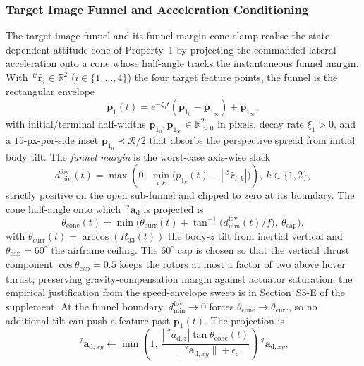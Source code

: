 \subsubsection{Target Image Funnel and Acceleration Conditioning} \label{fov cone: section}
The target image funnel and its funnel-margin cone clamp realise the state-dependent attitude cone of Property~1 by projecting the commanded lateral acceleration onto a cone whose half-angle tracks the instantaneous funnel margin. With $\,^\mathcal{C}\boldsymbol{\hat{r}}_i\in\mathbb{R}^2$ ($i\in\{1,\ldots,4\}$) the four target feature points, the funnel is the rectangular envelope
\begin{equation} \label{rho fov: equation}
    \boldsymbol{p}_1(t) = e^{-\xi_1 t}(\boldsymbol{p}_{1_0}-\boldsymbol{p}_{1_\infty}) + \boldsymbol{p}_{1_\infty},
\end{equation}
with initial/terminal half-widths $\boldsymbol{p}_{1_0},\boldsymbol{p}_{1_\infty}\in\mathbb{R}^2_{>0}$ in pixels, decay rate $\xi_1>0$, and a $15$-px-per-side inset $\boldsymbol{p}_{1_0}\prec\mathcal{R}/2$ that absorbs the perspective spread from initial body tilt. The \emph{funnel margin} is the worst-case axis-wise slack
\begin{equation} \label{d min fov: equation}
    d_\text{min}^\text{fov}(t) = \max\!\left(0,\ \min_{i,k}\!\big(p_{1_k}(t)-|\,^\mathcal{C}\hat{r}_{i,k}|\big)\right),\ k\in\{1,2\},
\end{equation}
strictly positive on the open sub-funnel and clipped to zero at its boundary. The cone half-angle onto which $\,^\mathcal{I}\boldsymbol{a}_\text{d}$ is projected is
\begin{equation} \label{cone angle: equation}
    \theta_\text{cone}(t) = \min\!\Big(\theta_\text{curr}(t) + \tan^{-1}\!\big(d_\text{min}^\text{fov}(t)/f\big),\ \theta_\text{cap}\Big),
\end{equation}
with $\theta_\text{curr}(t)=\arccos(R_{33}(t))$ the body-$z$ tilt from inertial vertical and $\theta_\text{cap}=60^\circ$ the airframe ceiling. The $60^\circ$ cap is chosen so that the vertical thrust component $\cos\theta_\text{cap}=0.5$ keeps the rotors at most a factor of two above hover thrust, preserving gravity-compensation margin against actuator saturation; the empirical justification from the speed-envelope sweep is in Section~S3-E of the supplement. At the funnel boundary, $d_\text{min}^\text{fov}\to 0$ forces $\theta_\text{cone}\to\theta_\text{curr}$, so no additional tilt can push a feature past $\boldsymbol{p}_1(t)$. The projection is
\begin{equation} \label{cone clamp: equation}
    \,^\mathcal{I}\boldsymbol{a}_{\text{d},xy}\leftarrow \min\!\left(1,\ \frac{|\,^\mathcal{I}a_{\text{d},z}|\tan\theta_\text{cone}(t)}{\|\,^\mathcal{I}\boldsymbol{a}_{\text{d},xy}\|+\epsilon_\text{c}}\right)\!\,^\mathcal{I}\boldsymbol{a}_{\text{d},xy},
\end{equation}
